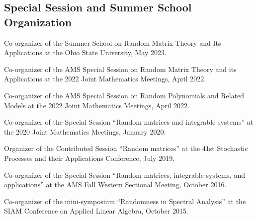\documentclass[letterpaper]{article}
\renewenvironment{itemize}{
  \begin{list}{}{
    \setlength{\leftmargin}{1em}
  }
}{
  \end{list}
}
\begin{document}

\subsection*{Special Session and Summer School Organization}
\begin{itemize}
	\item Co-organizer of the Summer School on Random Matrix Theory and Its Applications at the Ohio State University, May 2023. 
	\item Co-organizer of the AMS Special Session on Random Matrix Theory and its Applications at the 2022 Joint Mathematics Meetings, April 2022.
	\item Co-organizer of the AMS Special Session on Random Polynomials and Related Models at the 2022 Joint Mathematics Meetings, April 2022. 
	\item Co-organizer of the Special Session ``Random matrices and integrable systems'' at the 2020 Joint Mathematics Meetings, January 2020.  
	\item Organizer of the Contributed Session ``Random matrices'' at the $41$st Stochastic Processes and their Applications Conference, July 2019.
	\item Co-organizer of the Special Session ``Random matrices, integrable systems, and applications'' at the AMS Fall Western Sectional Meeting, October 2016.
	\item Co-organizer of the mini-symposium ``Randomness in Spectral Analysis'' at the SIAM Conference on Applied Linear Algebra, October 2015.
\end{itemize}
\end{document}
